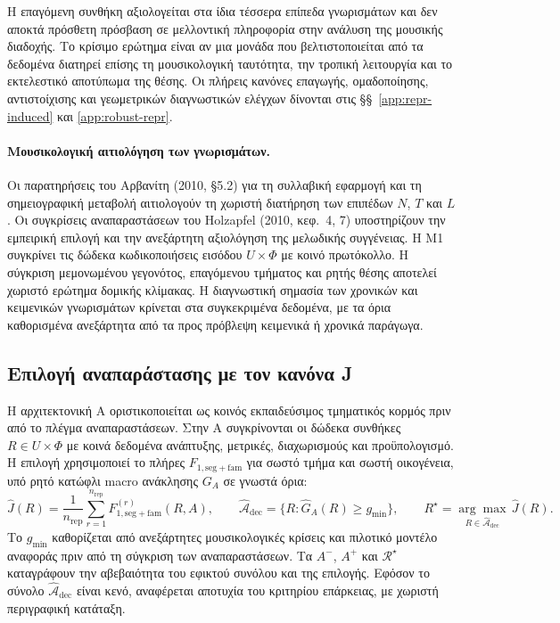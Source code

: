 \documentclass[11pt,a4paper]{article}
\begin{document}
Η επαγόμενη συνθήκη αξιολογείται στα ίδια τέσσερα επίπεδα γνωρισμάτων και δεν αποκτά πρόσθετη πρόσβαση σε μελλοντική πληροφορία στην ανάλυση της μουσικής διαδοχής. Το κρίσιμο ερώτημα είναι αν μια μονάδα που βελτιστοποιείται από τα δεδομένα διατηρεί επίσης τη μουσικολογική ταυτότητα, την τροπική λειτουργία και το εκτελεστικό αποτύπωμα της θέσης. Οι πλήρεις κανόνες επαγωγής, ομαδοποίησης, αντιστοίχισης και γεωμετρικών διαγνωστικών ελέγχων δίνονται στις §§~\ref{app:repr-induced} και \ref{app:robust-repr}.

\paragraph{Μουσικολογική αιτιολόγηση των γνωρισμάτων.} Οι παρατηρήσεις του Αρβανίτη (2010, §5.2) για τη συλλαβική εφαρμογή και τη σημειογραφική μεταβολή αιτιολογούν τη χωριστή διατήρηση των επιπέδων $N$, $T$ και $L$. Οι συγκρίσεις αναπαραστάσεων του Holzapfel (2010, κεφ.~4, 7) υποστηρίζουν την εμπειρική επιλογή και την ανεξάρτητη αξιολόγηση της μελωδικής συγγένειας. Η M1 συγκρίνει τις δώδεκα κωδικοποιήσεις εισόδου $U\times\Phi$ με κοινό πρωτόκολλο. Η σύγκριση μεμονωμένου γεγονότος, επαγόμενου τμήματος και ρητής θέσης αποτελεί χωριστό ερώτημα δομικής κλίμακας. Η διαγνωστική σημασία των χρονικών και κειμενικών γνωρισμάτων κρίνεται στα συγκεκριμένα δεδομένα, με τα όρια καθορισμένα ανεξάρτητα από τα προς πρόβλεψη κειμενικά ή χρονικά παράγωγα.

\subsection{Επιλογή αναπαράστασης με τον κανόνα J}

Η αρχιτεκτονική A οριστικοποιείται ως κοινός εκπαιδεύσιμος τμηματικός κορμός πριν από το πλέγμα αναπαραστάσεων. Στην A συγκρίνονται οι δώδεκα συνθήκες $R\in U\times\Phi$ με κοινά δεδομένα ανάπτυξης, μετρικές, διαχωρισμούς και προϋπολογισμό. Η επιλογή χρησιμοποιεί το πλήρες $F_{1,\mathrm{seg+fam}}$ για σωστό τμήμα και σωστή οικογένεια, υπό ρητό κατώφλι macro ανάκλησης $G_A$ σε γνωστά όρια:
\[
\widehat J(R)=\frac{1}{n_{\mathrm{rep}}}\sum_{r=1}^{n_{\mathrm{rep}}}F_{1,\mathrm{seg+fam}}^{(r)}(R,A),\qquad
\widehat{\mathcal A}_{\mathrm{dec}}=\{R:\widehat G_A(R)\ge g_{\min}\},\qquad
R^\star=\underset{R\in\widehat{\mathcal A}_{\mathrm{dec}}}{\arg\max}\,\widehat J(R).
\]
Το $g_{\min}$ καθορίζεται από ανεξάρτητες μουσικολογικές κρίσεις και πιλοτικό μοντέλο αναφοράς πριν από τη σύγκριση των αναπαραστάσεων. Τα $A^-$, $A^+$ και $\mathcal R^\star$ καταγράφουν την αβεβαιότητα του εφικτού συνόλου και της επιλογής. Εφόσον το σύνολο $\widehat{\mathcal A}_{\mathrm{dec}}$ είναι κενό, αναφέρεται αποτυχία του κριτηρίου επάρκειας, με χωριστή περιγραφική κατάταξη.
\end{document}
